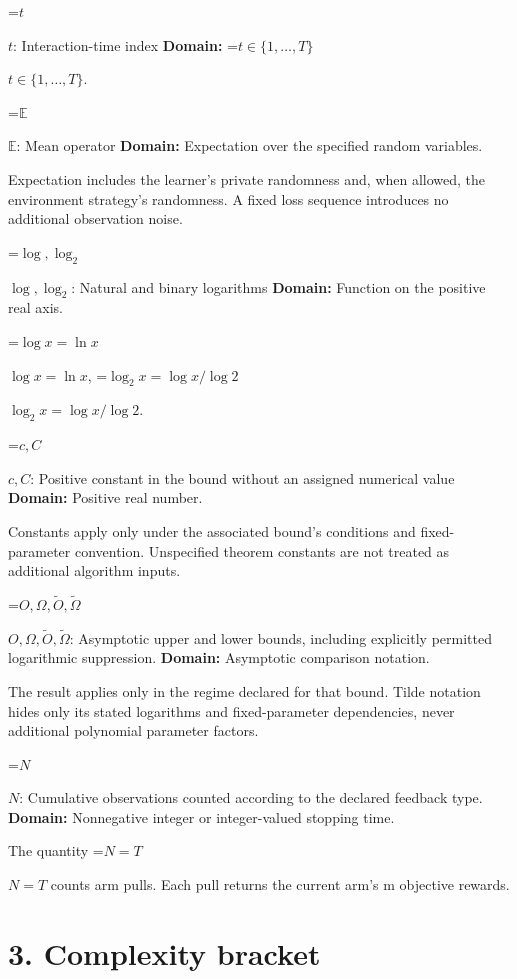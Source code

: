 \documentclass[10pt,a4paper]{article}
\newcommand{\AtlasMath}[1]{\par\begingroup\centering\setbox0=\hbox{$\displaystyle #1$}\ifdim\wd0>1.4\linewidth\typeout{ATLAS WIDE FORMULA: \the\wd0}\fi\ifdim\wd0>\linewidth\resizebox{\linewidth}{!}{\box0}\else\box0\fi\par\endgroup}
\newcommand{\AtlasInlineMath}[1]{\begingroup\setbox0=\hbox{$#1$}\ifdim\wd0>.4\linewidth\endgroup\AtlasMath{#1}\else\endgroup$#1$\fi}
\begin{document}
\AtlasInlineMath{t}: Interaction-time index \textbf{Domain:} \AtlasInlineMath{t\in\{1,\ldots,T\}}.



\AtlasInlineMath{\mathbb E}: Mean operator \textbf{Domain:} Expectation over the specified random variables.



Expectation includes the learner's private randomness and, when allowed, the environment strategy's randomness. A fixed loss sequence introduces no additional observation noise.



\AtlasInlineMath{\log,\log_2}: Natural and binary logarithms \textbf{Domain:} Function on the positive real axis.



\AtlasInlineMath{\log x=\ln x}, \AtlasInlineMath{\log_2x=\log x/\log2}.



\AtlasInlineMath{c,C}: Positive constant in the bound without an assigned numerical value \textbf{Domain:} Positive real number.



Constants apply only under the associated bound’s conditions and fixed-parameter convention. Unspecified theorem constants are not treated as additional algorithm inputs.



\AtlasInlineMath{O,\Omega,\widetilde O,\widetilde\Omega}: Asymptotic upper and lower bounds, including explicitly permitted logarithmic suppression. \textbf{Domain:} Asymptotic comparison notation.



The result applies only in the regime declared for that bound. Tilde notation hides only its stated logarithms and fixed-parameter dependencies, never additional polynomial parameter factors.



\AtlasInlineMath{N}: Cumulative observations counted according to the declared feedback type. \textbf{Domain:} Nonnegative integer or integer-valued stopping time.



The quantity \AtlasInlineMath{N=T} counts arm pulls. Each pull returns the current arm’s m objective rewards.



\section{3. Complexity bracket}
\end{document}
